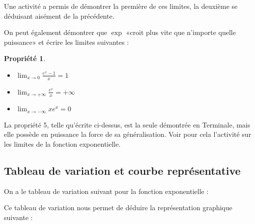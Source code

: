 \documentclass[12pt,a4paper,french]{article}
\theoremstyle{break}
\newtheorem{propriete}{Propriété}
\theoremstyle{plain}
\theoremstyle{nonumberplain}
\theoremstyle{nonumberbreak}
\begin{document}
Une activité a permis de démontrer la première de ces limites, la
deuxième se déduisant aisément de la précédente.

On peut également démontrer que $\exp$ «croit plus vite que n'importe
quelle puissance» et écrire les limites suivantes :

\begin{propriete}~\\[-7ex]
  \begin{multicols}{3}
    \begin{itemize}
      \item $\lim_{x\to0}\frac{e^x-1}{x} = 1$
      \item $\lim_{x\to+\infty}\frac{e^{x}}x = +\infty$
      \item $\lim_{x\to-\infty}xe^{x} = 0$
    \end{itemize}
  \end{multicols}
\end{propriete}

La propriété 5, telle qu'écrite ci-dessus, est la seule démontrée en
Terminale, mais elle possède en puissance la force de sa généralisation.
Voir pour cela l'activité sur les limites de la fonction exponentielle.

\subsection{Tableau de variation et courbe représentative}

On a le tableau de variation suivant pour la fonction exponentielle :

\begin{center}
\end{center}

Ce tableau de variation nous permet de déduire la représentation
graphique suivante :

\begin{center}
\end{center}
\end{document}
